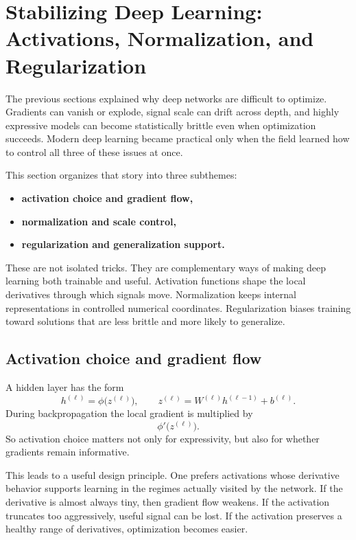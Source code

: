 \section{Stabilizing Deep Learning: Activations, Normalization, and Regularization}
\thispagestyle{plain}

The previous sections explained why deep networks are difficult to optimize.
Gradients can vanish or explode, signal scale can drift across depth, and highly expressive models can become statistically brittle even when optimization succeeds.
Modern deep learning became practical only when the field learned how to control all three of these issues at once.

\medskip

This section organizes that story into three subthemes:
\begin{itemize}
    \item \textbf{activation choice and gradient flow,}
    \item \textbf{normalization and scale control,}
    \item \textbf{regularization and generalization support.}
\end{itemize}

\medskip

These are not isolated tricks.
They are complementary ways of making deep learning both trainable and useful.
Activation functions shape the local derivatives through which signals move.
Normalization keeps internal representations in controlled numerical coordinates.
Regularization biases training toward solutions that are less brittle and more likely to generalize.

\subsection*{Activation choice and gradient flow}

A hidden layer has the form
\[
h^{(\ell)}=\phi\bigl(z^{(\ell)}\bigr),
\qquad
z^{(\ell)}=W^{(\ell)}h^{(\ell-1)}+b^{(\ell)}.
\]
During backpropagation the local gradient is multiplied by
\[
\phi'\bigl(z^{(\ell)}\bigr).
\]
So activation choice matters not only for expressivity, but also for whether gradients remain informative.

\medskip

This leads to a useful design principle.
One prefers activations whose derivative behavior supports learning in the regimes actually visited by the network.
If the derivative is almost always tiny, then gradient flow weakens.
If the activation truncates too aggressively, useful signal can be lost.
If the activation preserves a healthy range of derivatives, optimization becomes easier.

